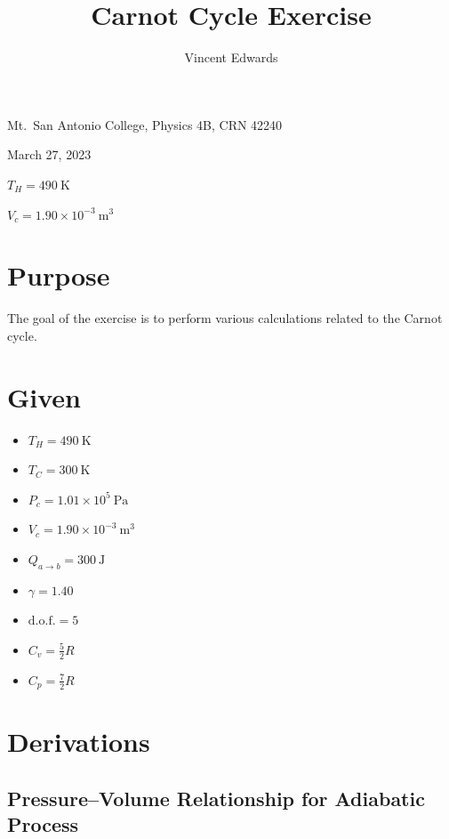 \documentclass[12pt]{iopart} %
\gdef\sci#1#2{#1 \times 10^{#2}}
\gdef\units#1{~\mathrm{#1}}
\begin{document}
\title{Carnot Cycle Exercise}
\author{Vincent Edwards}
\vspace{10pt}
\begin{indented}
  \item[]Mt.~San Antonio College, Physics 4B, CRN 42240
  \item[]March 27, 2023
  \item[]
  \item[]$T_H = 490~\mathrm{K}$
  \item[]$V_c = \sci{1.90}{-3} \units{m^3}$
\end{indented}
\newpage

\section{Purpose}

The goal of the exercise is to perform various calculations related to the Carnot cycle.

\section{Given}

\begin{itemize}
  \item $T_H = 490 \units{K}$
  \item $T_C = 300 \units{K}$
  \item $P_c = \sci{1.01}{5} \units{Pa}$
  \item $V_c = \sci{1.90}{-3} \units{m^3}$
  \item $Q_{a \to b} = 300 \units{J}$
  \item $\gamma = 1.40$
  \item $\mathrm{d.o.f.} = 5$
  \item $C_v = \frac 5 2 R$
  \item $C_p = \frac 7 2 R$
\end{itemize}

\section{Derivations}

\subsection{Pressure--Volume Relationship for Adiabatic Process}
\end{document}
